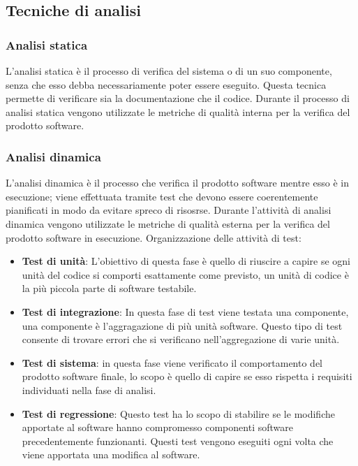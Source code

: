   \subsection{Tecniche di analisi}
    \subsubsection{Analisi statica}
    L'analisi statica è il processo di verifica del sistema o di un suo componente, senza che esso debba necessariamente poter essere eseguito.
    Questa tecnica permette di verificare sia la documentazione che il codice.
    Durante il processo di analisi statica vengono utilizzate le metriche di qualità interna per la verifica del prodotto software.
    \subsubsection{Analisi dinamica}
    L'analisi dinamica è il processo che verifica il prodotto software mentre esso è in esecuzione; viene effettuata tramite test che devono essere coerentemente pianificati in modo da evitare spreco di risosrse.
    Durante l'attività di analisi dinamica vengono utilizzate le metriche di qualità esterna per la verifica del prodotto software in esecuzione.
    Organizzazione delle attività di test:
    \begin{itemize}
      \item \textbf{Test di unità}: L'obiettivo di questa fase è quello di riuscire a capire se ogni unità del codice si comporti esattamente come previsto, un unità di codice è la più piccola parte di software testabile.
      \item \textbf{Test di integrazione}: In questa fase di test viene testata una componente, una componente è l'aggragazione di più unità software.
      Questo tipo di test consente di trovare errori che si verificano nell'aggregazione di varie unità.
      \item \textbf{Test di sistema}: in questa fase viene verificato il comportamento del prodotto software finale, lo scopo è quello di capire se esso rispetta i requisiti individuati nella fase di analisi.
      \item \textbf{Test di regressione}: Questo test ha lo scopo di stabilire se le modifiche apportate al software hanno compromesso componenti software precedentemente funzionanti.
      Questi test vengono eseguiti ogni volta che viene apportata una modifica al software.
    \end{itemize}
